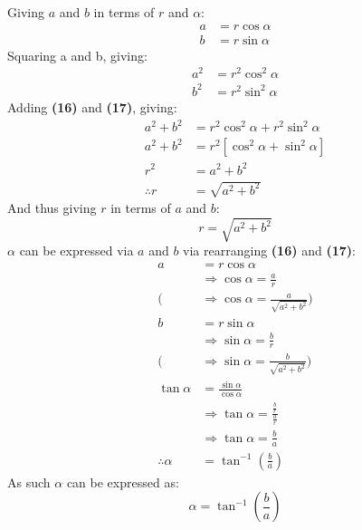 \documentclass{article}
\begin{document}
        Giving $a$ and $b$ in terms of $r$ and $\alpha$:
        \begin{align}
            a &= r\cos\alpha \\
            b &= r\sin\alpha
        \end{align}
        Squaring a and b, giving:
        \begin{align}
            a^2 &= r^2\cos^2{\alpha} \\
            b^2 &= r^2\sin^2{\alpha}
        \end{align}
        Adding \textbf{(16)} and \textbf{(17)}, giving:
        \begin{align*}
            a^2 + b^2 &= r^2\cos^2{\alpha} + r^2\sin^2{\alpha} \\
            a^2 + b^2 &= r^2[\cos^2{\alpha} + \sin^2{\alpha}] \\
            r^2 &= a^2 + b^2 \\
            \therefore r &= \sqrt{a^2 + b^2}
        \end{align*}
        And thus giving $r$ in terms of $a$ and $b$:
        \begin{equation}
            r = \sqrt{a^2 + b^2}
        \end{equation}
        $\alpha$ can be expressed via $a$ and $b$ via rearranging \textbf{(16)} and \textbf{(17)}:
        \begin{align*}
            a &= r\cos\alpha \\
            &\Rightarrow \cos\alpha = \frac{a}{r} \\
            (&\Rightarrow \cos\alpha = \frac{a}{\sqrt{a^2 + b^2}}) \\
            b &= r\sin\alpha \\
            &\Rightarrow \sin\alpha = \frac{b}{r} \\
            (&\Rightarrow \sin\alpha = \frac{b}{\sqrt{a^2 + b^2}}) \\
            \tan\alpha &= \frac{\sin\alpha}{\cos\alpha} \\
            &\Rightarrow \tan\alpha = \frac{\frac{b}{r}}{\frac{a}{r}} \\
            &\Rightarrow \tan\alpha = \frac{b}{a} \\
            \therefore \alpha &= \tan^{-1}{\left( \frac{b}{a}\right) }
        \end{align*}
        As such $\alpha$ can be expressed as:
        \begin{equation}
            \alpha = \tan^{-1}{\left( \frac{b}{a}\right) }
        \end{equation}
\end{document}
